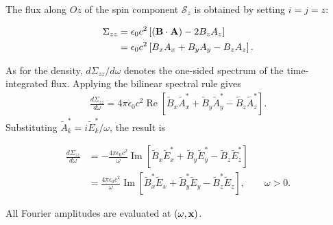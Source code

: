 The flux along $Oz$ of the spin component $\mathcal S_z$ is obtained by
setting $i=j=z$:
\begin{highlightbox}
  \begin{align}
    \Sigma_{zz}
    &=\epsilon_0c^2\left[({\bf B}\cdot{\bf A})-2B_z A_z\right]\nonumber\\
    &=\epsilon_0c^2\left[B_x A_x+B_y A_y-B_z A_z\right].
    \label{eq:canonical-sam-axial-flux}
  \end{align}
\end{highlightbox}
As for the density, $d\Sigma_{zz}/d\omega$ denotes the one-sided spectrum
of the time-integrated flux.  Applying the bilinear spectral rule gives
\begin{align}
  \frac{d\Sigma_{zz}}{d\omega}
  =4\pi\epsilon_0c^2\operatorname{Re}\left[
    \tilde B_x\tilde A_x^*+\tilde B_y\tilde A_y^*
    -\tilde B_z\tilde A_z^*\right].
  \label{eq:canonical-sam-flux-bilinear}
\end{align}
Substituting $\tilde A_k^*=i\tilde E_k^*/\omega$, the result is
\begin{importantbox}
  \begin{align}
    \frac{d\Sigma_{zz}}{d\omega}
    &=-\frac{4\pi\epsilon_0c^2}{\omega}\operatorname{Im}\left[
      \tilde B_x\tilde E_x^*+\tilde B_y\tilde E_y^*
      -\tilde B_z\tilde E_z^*\right]\nonumber\\
    &=\frac{4\pi\epsilon_0c^2}{\omega}\operatorname{Im}\left[
      \tilde B_x^*\tilde E_x+\tilde B_y^*\tilde E_y
      -\tilde B_z^*\tilde E_z\right],\qquad \omega>0.
    \label{eq:canonical-sam-flux-spectrum}
  \end{align}
\end{importantbox}
All Fourier amplitudes are evaluated at $(\omega,{\bf x})$.

